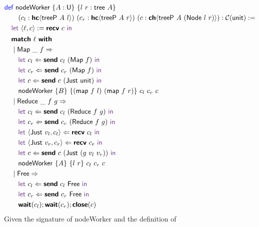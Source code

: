 \vspace{-1em}
\begingroup
\small
\addtolength{\jot}{-0.25em}
\begin{align*}
  &\Def\ \textsf{nodeWorker}\ \{A : \Un\}\ \{l\ r : \textsf{tree}\ A\}\\
  &\qquad(c_l : \HC{\textsf{treeP}\ A\ l})\ (c_r : \HC{\textsf{treeP}\ A\ r})\ (c : \CH{\textsf{treeP}\ A\ (\textsf{Node}\ l\ r)}) : \CM{\textsf{unit}} := \\
  &\quad\Let\ \langle{\ell, c}\rangle := \Recv\ c\ \In \\
  &\quad
    \begin{alignedat}{4}
      &\Match\ \ell\ \With\\
      &\mid \textsf{Map}\ \_\ f \Rightarrow \\
      &\quad\Let\ c_l \Leftarrow \Send\ c_l\ (\textsf{Map}\ f)\ \In \\
      &\quad\Let\ c_r \Leftarrow \Send\ c_r\ (\textsf{Map}\ f)\ \In \\
      &\quad\Let\ c \Leftarrow \Send\ c\ (\textsf{Just}\ \textsf{unit})\ \In \\
      &\quad\textsf{nodeWorker}\ \{B\}\ \{(\textsf{map}\ f\ l)\ (\textsf{map}\ f\ r)\}\ c_l\ c_r\ c \\
      &\mid \textsf{Reduce}\ \_\ f\ g \Rightarrow \\
      &\quad\Let\ c_l \Leftarrow \Send\ c_l\ (\textsf{Reduce}\ f\ g)\ \In \\
      &\quad\Let\ c_r \Leftarrow \Send\ c_r\ (\textsf{Reduce}\ f\ g)\ \In \\
      &\quad\Let\ \langle{\textsf{Just}\ v_l, c_l}\rangle \Leftarrow \Recv\ c_l\ \In \\
      &\quad\Let\ \langle{\textsf{Just}\ v_r, c_r}\rangle \Leftarrow \Recv\ c_r\ \In \\
      &\quad\Let\ c \Leftarrow \Send\ c\ (\textsf{Just}\ (g\ v_l\ v_r))\ \In \\
      &\quad\textsf{nodeWorker}\ \{A\}\ \{l\ r\}\ c_l\ c_r\ c \\
      &\mid \textsf{Free} \Rightarrow \\
      &\quad\Let\ c_l \Leftarrow \Send\ c_l\ \textsf{Free}\ \In \\
      &\quad\Let\ c_r \Leftarrow \Send\ c_r\ \textsf{Free}\ \In \\
      &\quad\Wait(c_l); \Wait(c_r); \Close(c)
    \end{alignedat}
\end{align*}
\endgroup
Given the signature of \textsf{nodeWorker} and the definition of
